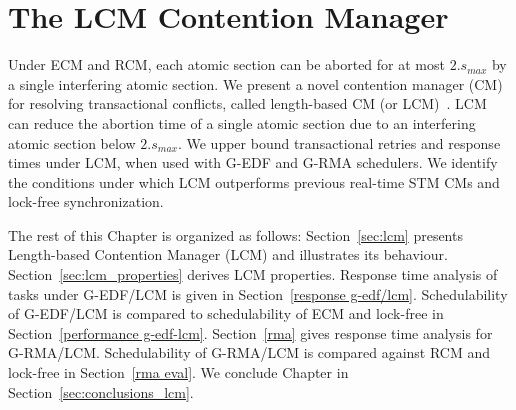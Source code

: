 \documentclass[12pt,english]{report}
\begin{document}

\chapter{\label{ch_lcm}The LCM Contention Manager}

Under ECM and RCM, each atomic section can be aborted for at most $2.s_{max}$ by a single interfering atomic section. We present a novel contention manager (CM) for resolving transactional conflicts, called length-based CM (or LCM)~\cite{lcmdac2012}. LCM can reduce the abortion time of a single atomic section due to an interfering atomic section below $2.s_{max}$. We upper bound transactional retries and response times under LCM, when used with G-EDF and  G-RMA schedulers. We identify the conditions under which LCM outperforms previous real-time STM CMs and lock-free synchronization.

The rest of this Chapter is organized as follows: Section~\ref{sec:lcm} presents Length-based Contention Manager (LCM) and illustrates its behaviour. Section~\ref{sec:lcm_properties} derives LCM properties. Response time analysis of tasks under G-EDF/LCM is given in Section~\ref{response g-edf/lcm}. Schedulability of G-EDF/LCM is compared to schedulability of ECM and lock-free in Section~\ref{performance g-edf-lcm}. Section~\ref{rma} gives response time analysis for G-RMA/LCM. Schedulability of G-RMA/LCM is compared against RCM and lock-free in Section~\ref{rma eval}. We conclude Chapter in Section~\ref{sec:conclusions_lcm}.
\end{document}
